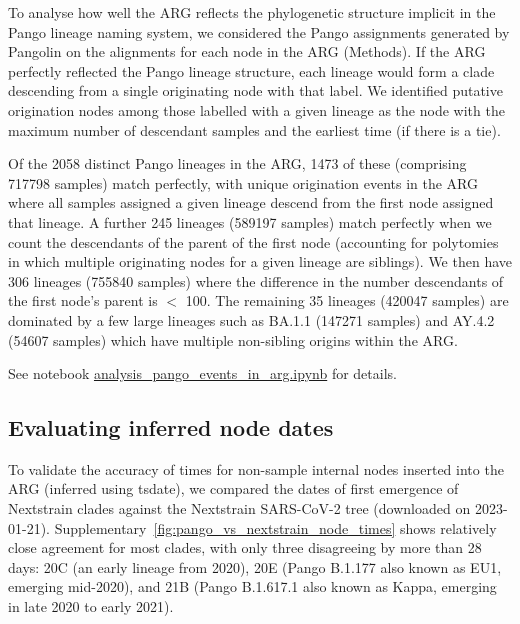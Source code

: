 \documentclass[12pt]{article}
\newcommand{\siref}[1]{Supplementary~\ref{#1}}
\begin{document}
To analyse how well the ARG reflects the phylogenetic structure implicit in the
Pango lineage naming system, we considered the Pango assignments generated by
Pangolin on the alignments for each node in the ARG (Methods). If the ARG
perfectly reflected the Pango lineage structure, each lineage would form a
clade descending from a single originating node with that label. We identified
putative origination nodes among those labelled with a given lineage as the node
with the maximum number of descendant samples and the earliest time (if there
is a tie).

Of the 2058 distinct Pango lineages in the ARG, 1473 of these (comprising
717798 samples) match perfectly, with unique origination events in the ARG
where all samples assigned a given lineage descend from the first node assigned
that lineage. A further 245 lineages (589197 samples) match perfectly when we
count the descendants of the parent of the first node (accounting for
polytomies in which multiple originating nodes for a given lineage are
siblings). We then have 306 lineages (755840 samples) where the difference in
the number descendants of the first node's parent is $<$ 100. The remaining 35
lineages (420047 samples) are dominated by a few large lineages such as BA.1.1
(147271 samples) and AY.4.2 (54607 samples) which have multiple non-sibling
origins within the ARG.

See notebook
\href{https://github.com/jeromekelleher/sc2ts-paper/blob/main/notebooks/analysis\_pango\_events\_in\_arg.ipynb}
{analysis\_pango\_events\_in\_arg.ipynb}
for details.


\subsection{Evaluating inferred node dates}
\label{sec:evaluating_node_dates}

To validate the accuracy of times for non-sample internal nodes
inserted into the ARG (inferred using tsdate),
we compared the dates of first emergence of
Nextstrain clades against the Nextstrain SARS-CoV-2 tree
(downloaded on 2023-01-21).
\siref{fig:pango_vs_nextstrain_node_times} shows
relatively close agreement for most clades,
with only three disagreeing by more than 28 days:
20C (an early lineage from 2020),
20E (Pango B.1.177 also known as EU1, emerging mid-2020), and
21B (Pango B.1.617.1 also known as Kappa, emerging in late 2020 to early 2021).
\end{document}
